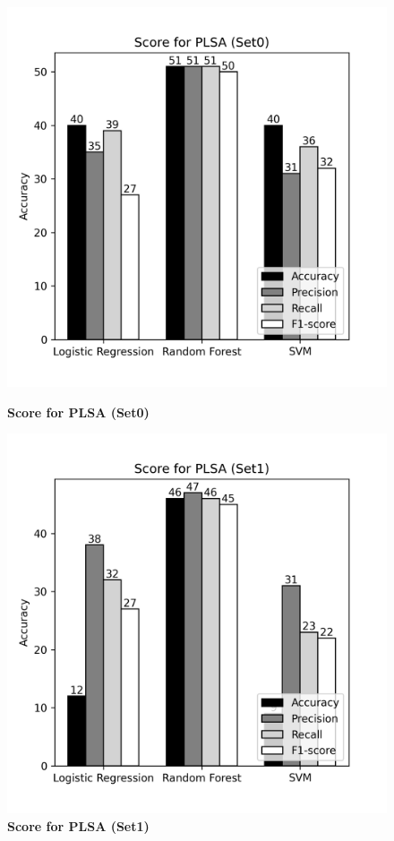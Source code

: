 \documentclass[12pt]{report}
\begin{document}
             \begin{figure}[!htb]
                \begin{minipage}{0.48\textwidth}
                  \centering
                  \includegraphics[scale=0.55]{plots/Score for PLSA (Set0).png}
                  \caption{\textbf{Score for PLSA (Set0)}}\label{Fig:typo1}
                \end{minipage}\hfill
                \begin{minipage}{0.48\textwidth}
                  \centering
                  \includegraphics[scale=0.55]{plots/Score for PLSA (Set1).png}
                  \caption{\textbf{Score for PLSA (Set1)}}\label{Fig:typo2}
                \end{minipage}
             \end{figure}
            
\end{document}
